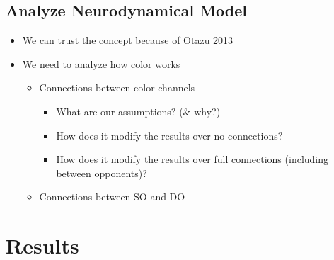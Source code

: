 \documentclass[journal,onecolumn]{IEEEtran}
\begin{document}
\subsection*{Analyze Neurodynamical Model}
\begin{itemize}
    \item We can trust the concept because of Otazu 2013
    \item We need to analyze how color works
    \begin{itemize}
        \item Connections between color channels
        \begin{itemize}
            \item What are our assumptions? (\& why?)
            \item How does it modify the results over no connections?
            \item How does it modify the results over full connections (including between opponents)?
        \end{itemize}
        \item Connections between SO and DO
    \end{itemize}
\end{itemize}



%
%
%
\section{Results}
\end{document}

